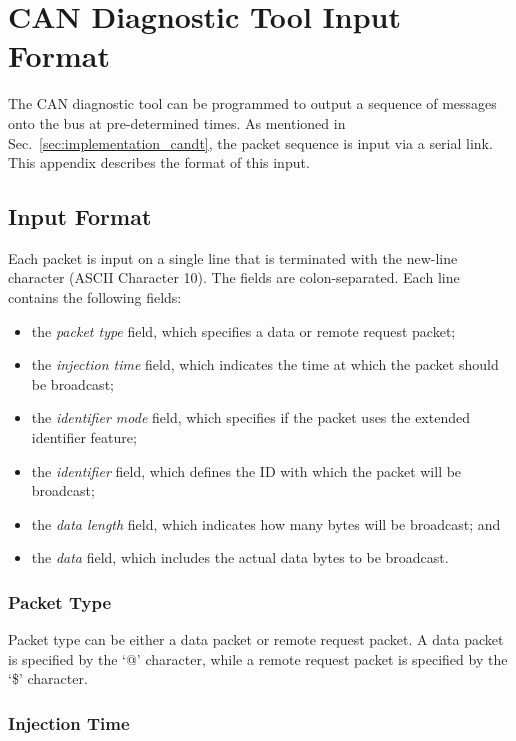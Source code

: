 
\chapter{CAN Diagnostic Tool Input Format}
\label{apx:candt}

The CAN diagnostic tool can be programmed to output a sequence of messages onto the bus at pre-determined times. As mentioned in Sec.\ \ref{sec:implementation_candt}, the packet sequence is input via a serial link. This appendix describes the format of this input.

\section*{Input Format}

Each packet is input on a single line that is terminated with the new-line character (ASCII Character 10). The fields are colon-separated. Each line contains the following fields:

\begin{itemize}
	\item the \emph{packet type} field, which specifies a data or remote request packet;
	\item the \emph{injection time} field, which indicates the time at which the packet should be broadcast;
	\item the \emph{identifier mode} field, which specifies if the packet uses the extended identifier feature;
	\item the \emph{identifier} field, which defines the ID with which the packet will be broadcast;
	\item the \emph{data length} field, which indicates how many bytes will be broadcast; and
	\item the \emph{data} field, which includes the actual data bytes to be broadcast.
\end{itemize}

\subsection*{Packet Type}

Packet type can be either a data packet or remote request packet. A data packet is specified by the `@' character, while a remote request packet is specified by the `\$' character.

\subsection*{Injection Time}

